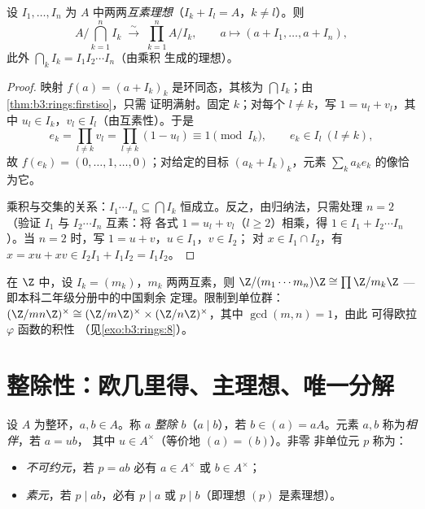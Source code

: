 \begin{theorem}[中国剩余定理]\label{thm:b3:rings:crt}
设 $I_1, \dots, I_n$ 为 $A$ 中两两\emph{互素理想}（$I_k + I_l = A$，$k \neq l$）。则
\[
A\Big/\bigcap_{k=1}^n I_k \;\xrightarrow{\;\sim\;}\;
\prod_{k=1}^n A/I_k,
\qquad
a \longmapsto (a + I_1, \dots, a + I_n),
\]
此外 $\bigcap_k I_k = I_1 I_2 \cdots I_n$（由乘积
生成的理想）。
\end{theorem}

\begin{proof}
映射 $f(a) = (a + I_k)_k$ 是环同态，其核为
$\bigcap I_k$；由\cref{thm:b3:rings:firstiso}，只需
证明满射。固定 $k$；对每个 $l \neq k$，写 $1 = u_l +
v_l$，其中 $u_l \in I_k$，$v_l \in I_l$（由互素性）。于是
\[
e_k = \prod_{l \neq k} v_l = \prod_{l\neq k}(1 - u_l)
\equiv 1 \pmod{I_k},
\qquad e_k \in I_l \ (l \neq k),
\]
故 $f(e_k) = (0, \dots, 1, \dots, 0)$；对给定的目标 $(a_k +
I_k)_k$，元素 $\sum_k a_k e_k$ 的像恰为它。

乘积与交集的关系：$I_1\cdots I_n \subseteq \bigcap I_k$
恒成立。反之，由归纳法，只需处理 $n = 2$
（验证 $I_1$ 与 $I_2\cdots I_n$ 互素：将
各式 $1 = u_l + v_l$（$l \geq 2$）相乘，得 $1 \in I_1 + I_2\cdots
I_n$）。当 $n = 2$ 时，写 $1 = u + v$，$u \in I_1$，$v \in I_2$；
对 $x \in I_1 \cap I_2$，有 $x = xu + xv \in I_2I_1 + I_1I_2 =
I_1I_2$。
\end{proof}

\begin{example}\label{ex:b3:rings:crtz}
在 $\Z$ 中，设 $I_k = (m_k)$，$m_k$ 两两互素，则 $\Z/(m_1\cdots
m_n)\Z \cong \prod \Z/m_k\Z$ --- 即本科二年级分册中的中国剩余
定理。限制到单位群：$(\Z/mn\Z)^\times \cong
(\Z/m\Z)^\times \times (\Z/n\Z)^\times$，其中 $\gcd(m,n)=1$，由此
可得欧拉 $\varphi$ 函数的积性
（见\cref{exo:b3:rings:8}）。
\end{example}

\section{整除性：欧几里得、主理想、唯一分解}

\begin{definition}\label{def:b3:rings:divisibility}
设 $A$ 为整环，$a, b \in A$。称 $a$
\emph{整除} $b$（$a \mid b$），若 $b \in (a) = aA$。元素 $a,
b$ 称为\emph{相伴}，若 $a = ub$，
其中 $u \in A^\times$（等价地 $(a) = (b)$）。非零
非单位元 $p$ 称为：
\begin{itemize}
  \item \emph{不可约元}，若 $p = ab$
        必有 $a \in A^\times$ 或 $b \in A^\times$；
  \item \emph{素元}，若 $p \mid ab$，必有 $p
        \mid a$ 或 $p \mid b$（即理想 $(p)$ 是素理想）。
\end{itemize}
\end{definition}

